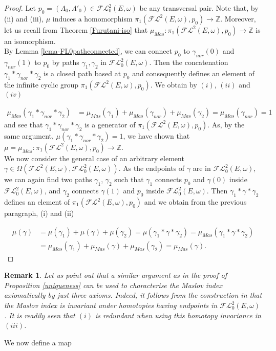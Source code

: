 \documentclass[a4paper,10pt]{article}
\newtheorem{rem}[theorem]{Remark}
\begin{document}
\begin{proof}
Let $p_0=(\Lambda_0,\Lambda'_0)\in\mathcal{FL}^2_0(E,\omega)$ be any transversal pair. Note that, by (ii) and (iii), $\mu$ induces a homomorphism $\pi_1(\mathcal{FL}^2(E,\omega),p_0)\rightarrow\mathbb{Z}$. Moreover, let us recall from Theorem \ref{Furutani-iso} that $\mu_{Mas}:\pi_1(\mathcal{FL}^2(E,\omega),p_0)\rightarrow\mathbb{Z}$ is an isomorphism.\\
By Lemma \ref{lema-FL0pathconnected}, we can connect $p_0$ to $\gamma_{nor}(0)$ and $\gamma_{nor}(1)$ to $p_0$ by paths $\gamma_1,\gamma_2$ in $\mathcal{FL}^2_0(E,\omega)$. Then the concatenation $\gamma_1\ast\gamma_{nor}\ast\gamma_2$ is a closed path based at $p_0$ and consequently defines an element of the infinite cyclic group $\pi_1(\mathcal{FL}^2(E,\omega),p_0)$. We obtain by $(i)$, $(ii)$ and $(iv)$

\begin{align*}
\mu_{Mas}(\gamma_1\ast\gamma_{nor}\ast\gamma_2)&=\mu_{Mas}(\gamma_1)+\mu_{Mas}(\gamma_{nor})+\mu_{Mas}(\gamma_2)=\mu_{Mas}(\gamma_{nor})=1
\end{align*}
and see that $\gamma_1\ast\gamma_{nor}\ast\gamma_2$ is a generator of $\pi_1(\mathcal{FL}^2(E,\omega),p_0)$. As, by the same argument, $\mu(\gamma_1\ast\gamma_{nor}\ast\gamma_2)=1$, we have shown that $\mu=\mu_{Mas}:\pi_1(\mathcal{FL}^2(E,\omega),p_0)\rightarrow\mathbb{Z}$.\\
We now consider the general case of an arbitrary element $\gamma\in\Omega(\mathcal{FL}^2(E,\omega),\mathcal{FL}^2_0(E,\omega))$. As the endpoints of $\gamma$ are in $\mathcal{FL}^2_0(E,\omega)$, we can again find two paths $\gamma_1$, $\gamma_2$ such that $\gamma_1$ connects $p_0$ and $\gamma(0)$ inside $\mathcal{FL}^2_0(E,\omega)$, and $\gamma_2$ connects $\gamma(1)$ and $p_0$ inside $\mathcal{FL}^2_0(E,\omega)$. Then $\gamma_1\ast\gamma\ast\gamma_2$ defines an element of $\pi_1(\mathcal{FL}^2(E,\omega),p_0)$ and we obtain from the previous paragraph, (i) and (ii)

\begin{align*}
\mu(\gamma)&=\mu(\gamma_1)+\mu(\gamma)+\mu(\gamma_2)=\mu(\gamma_1\ast\gamma\ast\gamma_2)=\mu_{Mas}(\gamma_1\ast\gamma\ast\gamma_2)\\
&=\mu_{Mas}(\gamma_1)+\mu_{Mas}(\gamma)+\mu_{Mas}(\gamma_2)=\mu_{Mas}(\gamma).
\end{align*}  
\end{proof}
\noindent

\begin{rem}
Let us point out that a similar argument as in the proof of Proposition \ref{uniqueness} can be used to characterise the Maslov index axiomatically by just three axioms. Indeed, it follows from the construction in \cite{Furutani} that the Maslov index is invariant under homotopies having endpoints in $\mathcal{FL}^2_0(E,\omega)$. It is readily seen that $(i)$ is redundant when using this homotopy invariance in $(iii)$.   
\end{rem}
\noindent
We now define a map 
\end{document}
